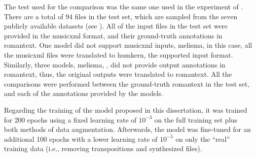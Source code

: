
The test used for the comparison was the same one used in
the experiment of .
There are a total of 94 files in the test set, which are
sampled from the seven publicly available datasets (see
). All of the input files
in the test set were provided in the \gls{musicxml} format,
and their ground-truth annotations in \gls{romantext}. One
model did not support \gls{musicxml} inputs, \gls{melisma},
in this case, all the \gls{musicxml} files were translated
to \gls{humkern}, the supported input format. Similarly,
three models, \gls{melisma}, \textcite{chen2021attend,
mcleod2021modular}, did not provide output annotations in
\gls{romantext}, thus, the original outputs were translated
to \gls{romantext}. All the comparisons were performed
between the ground-truth \gls{romantext} in the test set,
and each of the annotations provided by the models. 

Regarding the training of the model proposed in this
dissertation, it was trained for 200 epochs using a fixed
learning rate of $10^{-3}$ on the full training set plus
both methods of data augmentation. Afterwards, the model was
fine-tuned for an additional 100 epochs with a lower
learning rate of $10^{-5}$ on only the ``real'' training
data (i.e., removing transpositions and synthesized files).

